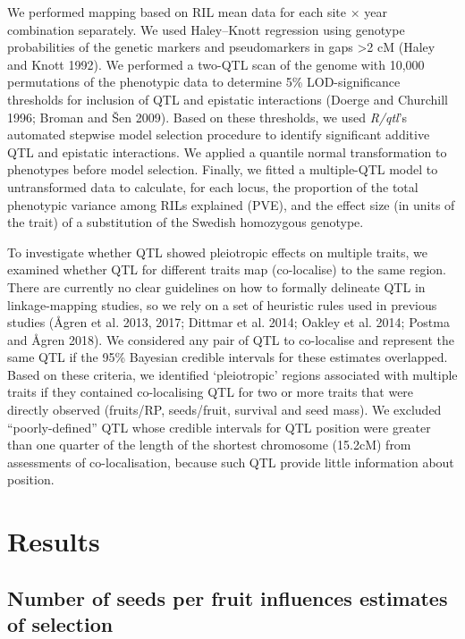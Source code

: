 \documentclass[]{article}
\begin{document}
We performed mapping based on RIL mean data for each site × year combination separately. We used Haley--Knott regression using genotype probabilities of the genetic markers and pseudomarkers in gaps \textgreater{}2 cM (Haley and Knott 1992). We performed a two-QTL scan of the genome with 10,000 permutations of the phenotypic data to determine 5\% LOD-significance thresholds for inclusion of QTL and epistatic interactions (Doerge and Churchill 1996; Broman and Šen 2009). Based on these thresholds, we used \emph{R/qtl}'s automated stepwise model selection procedure to identify significant additive QTL and epistatic interactions. We applied a quantile normal transformation to phenotypes before model selection. Finally, we fitted a multiple-QTL model to untransformed data to calculate, for each locus, the proportion of the total phenotypic variance among RILs explained (PVE), and the effect size (in units of the trait) of a substitution of the Swedish homozygous genotype.

To investigate whether QTL showed pleiotropic effects on multiple traits, we examined whether QTL for different traits map (co-localise) to the same region. There are currently no clear guidelines on how to formally delineate QTL in linkage-mapping studies, so we rely on a set of heuristic rules used in previous studies (Ågren et al. 2013, 2017; Dittmar et al. 2014; Oakley et al. 2014; Postma and Ågren 2018). We considered any pair of QTL to co-localise and represent the same QTL if the 95\% Bayesian credible intervals for these estimates overlapped. Based on these criteria, we identified `pleiotropic' regions associated with multiple traits if they contained co-localising QTL for two or more traits that were directly observed (fruits/RP, seeds/fruit, survival and seed mass). We excluded ``poorly-defined'' QTL whose credible intervals for QTL position were greater than one quarter of the length of the shortest chromosome (15.2cM) from assessments of co-localisation, because such QTL provide little information about position.

\hypertarget{results}{%
\section{Results}\label{results}}

\hypertarget{number-of-seeds-per-fruit-influences-estimates-of-selection}{%
\subsection{Number of seeds per fruit influences estimates of selection}\label{number-of-seeds-per-fruit-influences-estimates-of-selection}}
\end{document}
